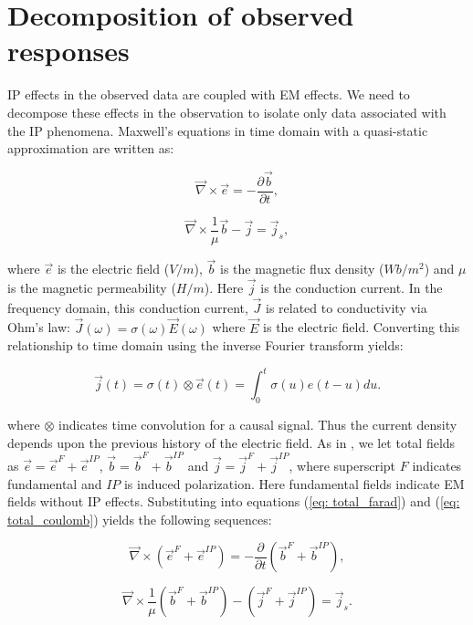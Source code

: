 \documentclass[extra,mreferee]{gji}
\newcommand{\curl}{{\vec \nabla}\times}
\newcommand {\J}{{\vec J}}
\newcommand {\E}{{\vec E}}
\renewcommand {\j}  { {\vec j} }
\renewcommand {\b}  { {\vec b} }
\newcommand {\e}  { {\vec e} }
\begin{document}
\section{Decomposition of observed responses}
IP effects in the observed data are coupled with EM effects. We need to decompose these effects in the observation to isolate only data associated with the IP phenomena.  
Maxwell's equations in time domain with a quasi-static approximation are written as:
\begin{linenomath*}
\begin{equation}
  \curl{\e} = -\frac{\partial \b}{\partial t},
  \label{eq: total_farad}
\end{equation}
\end{linenomath*}
\begin{linenomath*}
\begin{equation}
  \curl{\frac{1}{\mu}\b} - \j= \j_{s},
  \label{eq: total_coulomb}
\end{equation}
\end{linenomath*}
where $\e$ is the electric field ($V/m$), $\b$ is the magnetic flux density ($Wb/m^2$) and $\mu$ is the magnetic permeability ($H/m$). Here $\j$ is the conduction current. In the frequency domain, this conduction current, $\J$ is related to conductivity via Ohm’s law: $\J(\omega) = \sigma(\omega)\E(\omega)$ where $\E$ is the electric field. 
Converting this relationship to time domain using the inverse Fourier transform yields:
\begin{linenomath*}
\begin{equation}
  \j(t) = \sigma(t)\otimes \e(t) = \int_0^t \sigma(u) e(t-u) du.
  \label{eq: ohms_law_convolution}
\end{equation}
\end{linenomath*}
where $\otimes$ indicates time convolution for a causal signal.  
Thus the current density depends upon the previous history of the electric field.
As in \cite{Smith1988a}, we let total fields as $\e = \e^{F} + \e^{IP}$, $\b = \b^{F} + \b^{IP}$ and $\j = \j^{F} + \j^{IP}$, where superscript $F$ indicates fundamental and $IP$ is induced polarization. 
Here fundamental fields indicate EM fields without IP effects. 
Substituting into equations (\ref{eq: total_farad}) and (\ref{eq: total_coulomb}) yields the following sequences:
\begin{linenomath*}
\begin{equation}
  \curl({\e^{F}+\e^{IP}}) = -\frac{\partial}{\partial t} (\b^{F}+\b^{IP}),
\end{equation}
\end{linenomath*}
\begin{linenomath*}
\begin{equation}
  \curl\frac{1}{\mu}(\b^{F}+\b^{IP}) - (\j^{F}+\j^{IP})= \j_{s}.
\end{equation}
\end{linenomath*}
\end{document}
